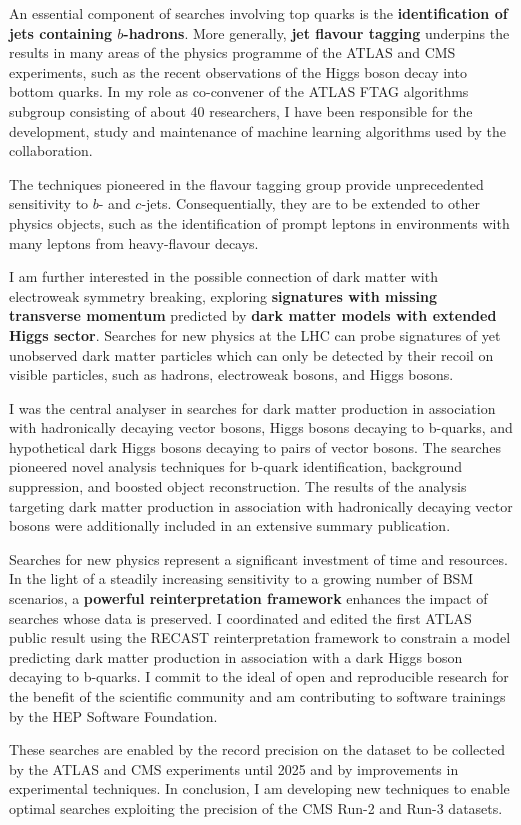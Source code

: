 \documentclass{article}
\begin{document}
\medskip

An essential component of searches involving top quarks is the \textbf{identification of jets containing \(b\)-hadrons}. More generally, \textbf{jet flavour tagging} underpins the results in many areas of the physics programme of the ATLAS and CMS experiments, such as the recent observations of the Higgs boson decay into bottom quarks.
In my role as co-convener of the ATLAS FTAG algorithms subgroup consisting of about 40 researchers, I have been responsible for the development, study and maintenance of machine learning algorithms used by the collaboration.

The techniques pioneered in the flavour tagging group provide unprecedented sensitivity to \(b\)- and \(c\)-jets. Consequentially, they are to be extended to other physics objects, such as the identification of prompt leptons in environments with many leptons from heavy-flavour decays.
\medskip

I am further interested in the possible connection of dark matter with electroweak symmetry breaking, exploring \textbf{signatures with missing transverse momentum} predicted by \textbf{dark matter models with extended Higgs sector}.
Searches for new physics at the LHC can probe signatures of yet unobserved dark matter particles which can only be detected by their recoil on visible particles, such as hadrons, electroweak bosons, and Higgs bosons.

I was the central analyser in searches for dark matter production in association with hadronically decaying vector bosons, Higgs bosons decaying to b-quarks, and hypothetical dark Higgs bosons decaying to pairs of vector bosons. The searches pioneered novel analysis techniques for b-quark identification, background suppression, and boosted object reconstruction.
The results of the analysis targeting dark matter production in association with hadronically decaying vector bosons were additionally included in an extensive summary publication.
\medskip

Searches for new physics represent a significant investment of time and resources. In the light of a steadily increasing sensitivity to a growing number of BSM scenarios, a \textbf{powerful reinterpretation framework} enhances the impact of searches whose data is preserved. I coordinated and edited the first ATLAS public result using the RECAST reinterpretation framework to constrain a model predicting dark matter production in association with a dark Higgs boson decaying to b-quarks. I commit to the ideal of open and reproducible research for the benefit of the scientific community and am contributing to software trainings by the HEP Software Foundation.
\medskip

These searches are enabled by the record precision on the dataset to be collected by the ATLAS and CMS experiments until 2025 and by improvements in experimental techniques. In conclusion, I am developing new techniques to enable optimal searches exploiting the precision of the CMS Run-2 and Run-3 datasets.

\end{document}
